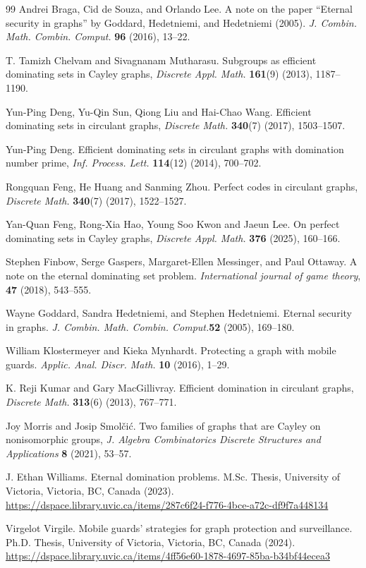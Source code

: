 \documentclass{amsart}
\theoremstyle{remark}
\theoremstyle{definition}
\begin{document}
\begin{thebibliography}{99}
Andrei Braga, Cid de Souza, and Orlando Lee. A note on the paper ``Eternal security in graphs'' by Goddard, Hedetniemi, and Hedetniemi (2005).
\emph{J. Combin. Math. Combin. Comput.} \textbf{96} (2016), 13--22.

 T. Tamizh Chelvam and Sivagnanam Mutharasu. Subgroups as efficient dominating sets in Cayley graphs, \emph{Discrete Appl. Math.} \textbf{161}(9) (2013), 1187--1190.

 Yun-Ping Deng, Yu-Qin Sun, Qiong Liu and Hai-Chao Wang. Efficient dominating sets in circulant graphs, \emph{Discrete Math.} \textbf{340}(7) (2017), 1503--1507.

 Yun-Ping Deng. Efficient dominating sets in circulant graphs with domination number prime, \emph{Inf. Process. Lett.} \textbf{114}(12) (2014), 700--702.

 Rongquan Feng, He Huang and Sanming Zhou. Perfect codes in circulant graphs, \emph{Discrete Math.} \textbf{340}(7) (2017), 1522--1527.

 Yan-Quan Feng, Rong-Xia Hao, Young Soo Kwon and Jaeun Lee. On perfect dominating sets in Cayley graphs, \emph{Discrete Appl. Math.} \textbf{376} (2025), 160--166.

 Stephen Finbow, Serge Gaspers, Margaret-Ellen Messinger, and Paul Ottaway. 
A note on the eternal dominating set problem. \emph{International journal of game theory}, \textbf{47} (2018), 543--555.

Wayne Goddard, Sandra Hedetniemi, and Stephen Hedetniemi. Eternal security in graphs. \emph{J. Combin. Math. Combin. Comput.}\textbf{52}
(2005), 169--180.

 William Klostermeyer and Kieka Mynhardt.
Protecting a graph with mobile guards. 
\emph{Applic. Anal. Discr. Math.} \textbf{10} (2016), 1--29.

 K. Reji Kumar and Gary MacGillivray. Efficient domination in circulant graphs, \emph{Discrete Math.} \textbf{313}(6) (2013), 767--771.

 Joy Morris and Josip Smol\v{c}i\'{c}. Two families of graphs that are Cayley on nonisomorphic groups, \emph{J. Algebra Combinatorics Discrete Structures and Applications} \textbf{8} (2021), 53--57. 

 J. Ethan Williams.
Eternal domination problems.
M.Sc. Thesis, University of Victoria,
Victoria, BC, Canada (2023).
\url{https://dspace.library.uvic.ca/items/287c6f24-f776-4bce-a72c-df9f7a448134}

 Virgelot Virgile.
Mobile guards' strategies for graph protection and surveillance.
Ph.D. Thesis, University of Victoria,
Victoria, BC, Canada (2024).
\url{https://dspace.library.uvic.ca/items/4ff56e60-1878-4697-85ba-b34bf44ecea3}

\end{thebibliography}
\end{document}

